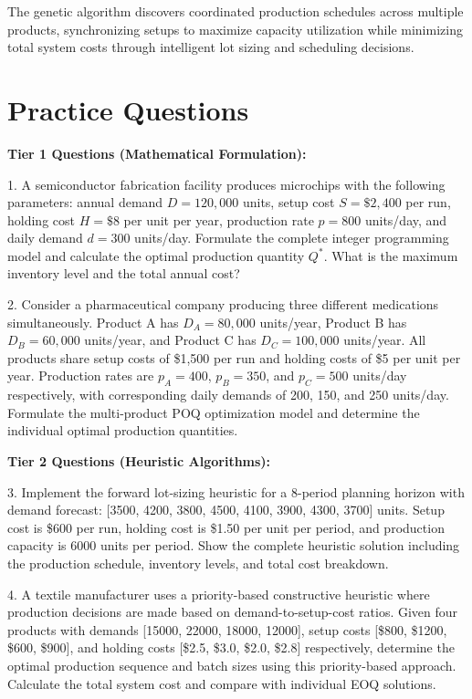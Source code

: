 \documentclass{article}
\begin{document}
The genetic algorithm discovers coordinated production schedules across multiple products, synchronizing setups to maximize capacity utilization while minimizing total system costs through intelligent lot sizing and scheduling decisions.

\section{Practice Questions}

\textbf{Tier 1 Questions (Mathematical Formulation):}

1. A semiconductor fabrication facility produces microchips with the following parameters: annual demand $D = 120,000$ units, setup cost $S = \$2,400$ per run, holding cost $H = \$8$ per unit per year, production rate $p = 800$ units/day, and daily demand $d = 300$ units/day. Formulate the complete integer programming model and calculate the optimal production quantity $Q^*$. What is the maximum inventory level and the total annual cost?

2. Consider a pharmaceutical company producing three different medications simultaneously. Product A has $D_A = 80,000$ units/year, Product B has $D_B = 60,000$ units/year, and Product C has $D_C = 100,000$ units/year. All products share setup costs of \$1,500 per run and holding costs of \$5 per unit per year. Production rates are $p_A = 400$, $p_B = 350$, and $p_C = 500$ units/day respectively, with corresponding daily demands of 200, 150, and 250 units/day. Formulate the multi-product POQ optimization model and determine the individual optimal production quantities.

\textbf{Tier 2 Questions (Heuristic Algorithms):}

3. Implement the forward lot-sizing heuristic for a 8-period planning horizon with demand forecast: [3500, 4200, 3800, 4500, 4100, 3900, 4300, 3700] units. Setup cost is \$600 per run, holding cost is \$1.50 per unit per period, and production capacity is 6000 units per period. Show the complete heuristic solution including the production schedule, inventory levels, and total cost breakdown.

4. A textile manufacturer uses a priority-based constructive heuristic where production decisions are made based on demand-to-setup-cost ratios. Given four products with demands [15000, 22000, 18000, 12000], setup costs [\$800, \$1200, \$600, \$900], and holding costs [\$2.5, \$3.0, \$2.0, \$2.8] respectively, determine the optimal production sequence and batch sizes using this priority-based approach. Calculate the total system cost and compare with individual EOQ solutions.
\end{document}
